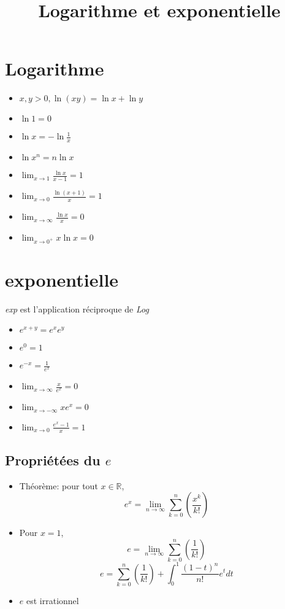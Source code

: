 \documentclass{article}
\title{Logarithme et exponentielle}
\date{}
\begin{document}
\maketitle

\section{Logarithme}
	\begin{itemize}
	\item $ x,y>0, \ln (xy) = \ln x + \ln y $
	\item $ \ln 1 = 0 $
	\item $ \ln x = -\ln \frac{1}{x} $
	\item $ \ln x^n = n\ln x $
	\newline

	\item $ \lim_{x\to 1} \frac{\ln x}{x-1} = 1 $
	\item $ \lim_{x\to 0} \frac{\ln (x+1)}{x} = 1 $
	\item $ \lim_{x\to\infty} \frac{\ln x}{x} = 0 $
	\item $ \lim_{x\to 0^+} x\ln x = 0 $
	\end{itemize}

\section{exponentielle}
\emph{exp} est l'application réciproque de \emph{Log}
	\begin{itemize}
	\item $ e^{x+y} = e^xe^y $
	\item $ e^0 = 1 $
	\item $ e^{-x} = \frac{1}{e^x} $
	\newline

	\item $ \lim_{x\to\infty} \frac{x}{e^x} = 0 $
	\item $ \lim_{x\to-\infty} xe^x = 0 $
	\item $ \lim_{x\to 0} \frac{e^x-1}{x} = 1 $
	\end{itemize}

\subsection{Propri\'{e}t\'{e}es du $e$}
\begin{itemize}
	\item Th\'{e}or\`{e}me: pour tout $x \in \mathbb{R}$,
	$$ e^x = \lim_{n\to\infty} \sum_{k=0}^{n} (\frac{x^k}{k!}) $$

	\item Pour $x = 1$,
	$$ e = \lim_{n\to\infty} \sum_{k=0}^{n} (\frac{1}{k!}) $$
	$$ e = \sum_{k=0}^{n} (\frac{1}{k!}) + \int_{0}^{1} \frac{(1-t)^n}{n!}e^tdt $$

	\item $e$ est irrationnel
\end{itemize}
\end{document}
